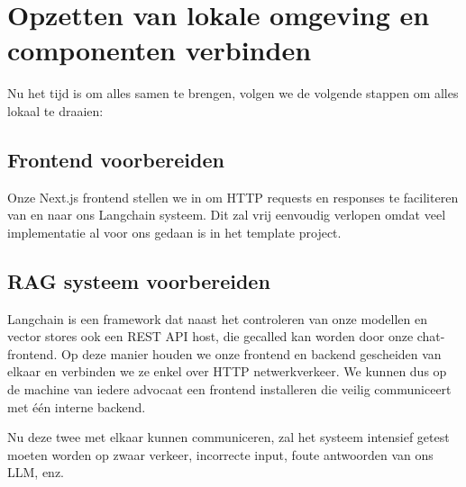 \chapter{Opzetten van lokale omgeving en componenten verbinden}
Nu het tijd is om alles samen te brengen, volgen we de volgende stappen om alles lokaal te draaien:

\section{Frontend voorbereiden}
Onze Next.js frontend stellen we in om HTTP requests en responses te faciliteren van en naar ons Langchain systeem. 
Dit zal vrij eenvoudig verlopen omdat veel implementatie al voor ons gedaan is in het template project. 

\section{RAG systeem voorbereiden}
Langchain is een framework dat naast het controleren van onze modellen en vector stores ook een REST API host, die gecalled kan worden door onze chat-frontend. 
Op deze manier houden we onze frontend en backend gescheiden van elkaar en verbinden we ze enkel over HTTP netwerkverkeer. 
We kunnen dus op de machine van iedere advocaat een frontend installeren die veilig communiceert met één interne backend. 

Nu deze twee met elkaar kunnen communiceren, zal het systeem intensief getest moeten worden op zwaar verkeer, incorrecte input, foute antwoorden van ons LLM, enz. 


